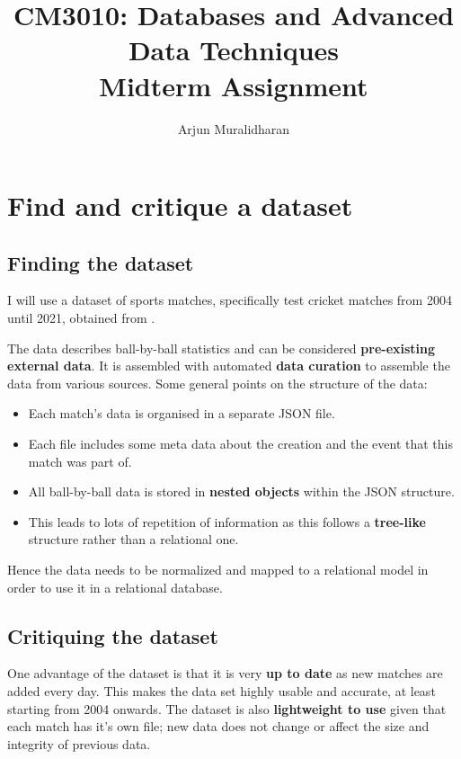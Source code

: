 \title{CM3010: Databases and Advanced Data Techniques \\ Midterm Assignment}
\author{Arjun Muralidharan}



\section{Find and critique a dataset}

\subsection{Finding the dataset}

I will use a dataset of sports matches, specifically test cricket matches from 2004 until 2021, obtained from \cite{rushe_2021}.

The data describes ball-by-ball statistics and can be considered \textbf{pre-existing external data}. It is assembled with automated \textbf{data curation} to assemble the data from various sources. Some general points on the structure of the data:

\begin{itemize}
    \item Each match's data is organised in a separate JSON file.
    \item Each file includes some meta data about the creation and the event that this match was part of.
    \item All ball-by-ball data is stored in \textbf{nested objects} within the JSON structure.
    \item This leads to lots of repetition of information as this follows a \textbf{tree-like} structure rather than a relational one.
\end{itemize}

Hence the data needs to be normalized and mapped to a relational model in order to use it in a relational database.

\subsection{Critiquing the dataset}

One advantage of the dataset is that it is very \textbf{up to date} as new matches are added every day. This makes the data set highly usable and accurate, at least starting from 2004 onwards. The dataset is also \textbf{lightweight to use} given that each match has it's own file; new data does not change or affect the size and integrity of previous data.

